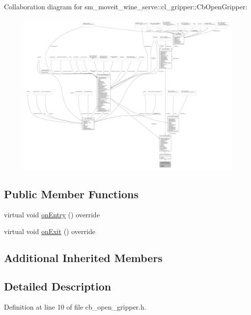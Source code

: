 Collaboration diagram for sm\+\_\+moveit\+\_\+wine\+\_\+serve\+:\+:cl\+\_\+gripper\+:\+:Cb\+Open\+Gripper\+:
\nopagebreak
\begin{figure}[H]
\begin{center}
\leavevmode
\includegraphics[width=350pt]{classsm__moveit__wine__serve_1_1cl__gripper_1_1CbOpenGripper__coll__graph}
\end{center}
\end{figure}
\subsection*{Public Member Functions}
\begin{DoxyCompactItemize}
\item 
virtual void \hyperlink{classsm__moveit__wine__serve_1_1cl__gripper_1_1CbOpenGripper_aa54be14caa3617182da50f7ad5541ed4}{on\+Entry} () override
\item 
virtual void \hyperlink{classsm__moveit__wine__serve_1_1cl__gripper_1_1CbOpenGripper_a2e44d207617c4a1d27c35668a5080832}{on\+Exit} () override
\end{DoxyCompactItemize}
\subsection*{Additional Inherited Members}


\subsection{Detailed Description}


Definition at line 10 of file cb\+\_\+open\+\_\+gripper.\+h.



